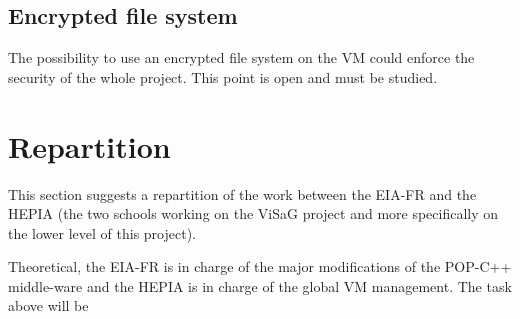 \subsection{Encrypted file system}
The possibility to use an encrypted file system on the VM could enforce the security of the whole project. This point is open and must be studied. 

\pagebreak
\section{Repartition}
This section suggests a repartition of the work between the EIA-FR and the HEPIA (the two schools working on the ViSaG project and more specifically on the lower level of this project).\s

Theoretical, the EIA-FR is in charge of the major modifications of the POP-C++ middle-ware and the HEPIA is in charge of the global VM management. The task above will be 


